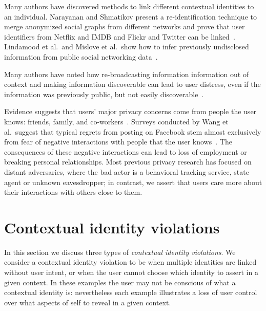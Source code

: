 \documentclass[10pt, conference, compsocconf]{IEEEtran}
\begin{document}
Many authors have discovered methods to link different contextual identities to
an individual. Narayanan and Shmatikov present a re-identification technique
to merge anonymized social graphs from different networks and prove that
user identifiers from Netflix and IMDB and Flickr and Twitter can be
linked~\cite{narayanan1,narayanan2}. Lindamood et al.~and Mislove et al.~show
how to infer previously undisclosed information from public social networking
data~\cite{lindamood,mislove}.

Many authors have noted how re-broadcasting information information out of
context and making information discoverable can lead to user distress, even if
the information was previously public, but not easily
discoverable~\cite{boyd1,chew,nissenbaum}.

Evidence suggests that users' major privacy concerns come from people the user
knows: friends, family, and co-workers~\cite{fbtips2,fbtips1}.  Surveys
conducted by Wang et al.~suggest that typical regrets from posting on Facebook
stem almost exclusively from fear of negative interactions with people that the
user knows~\cite{wang}. The consequences of these negative interactions can
lead to loss of employment or breaking personal relationships.  Most previous
privacy research has focused on distant adversaries, where the bad actor is a
behavioral tracking service, state agent or unknown eavesdropper; in contrast,
we assert that users care more about their interactions with others close to
them.

\section{Contextual identity violations}
In this section we discuss three types of \textit{contextual identity
violations}. We consider a contextual identity violation to be when multiple
identities are linked without user intent, or when the user cannot choose which
identity to assert in a given context. In these examples the user
may not be conscious of what a contextual identity is: nevertheless each
example illustrates a loss of user control over what aspects of self to
reveal in a given context.

\label{sec:examples}
\end{document}
